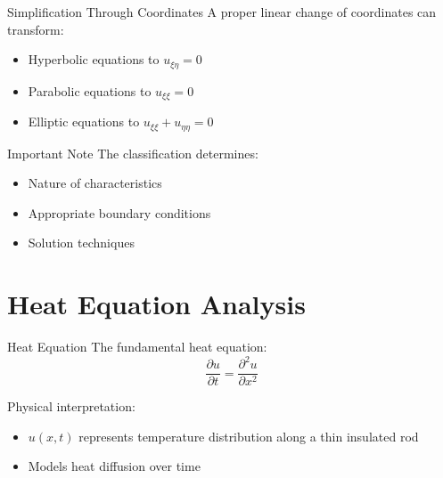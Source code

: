 \documentclass{beamer}
\begin{document}
\begin{frame}{Simplification Through Coordinates}
    A proper linear change of coordinates can transform:
    \begin{itemize}
        \item Hyperbolic equations to $u_{\xi\eta} = 0$
        \item Parabolic equations to $u_{\xi\xi} = 0$
        \item Elliptic equations to $u_{\xi\xi} + u_{\eta\eta} = 0$
    \end{itemize}
    
    \begin{alertblock}{Important Note}
        The classification determines:
        \begin{itemize}
            \item Nature of characteristics
            \item Appropriate boundary conditions
            \item Solution techniques
        \end{itemize}
    \end{alertblock}
\end{frame}


\section{Heat Equation Analysis}

\begin{frame}{Heat Equation}
    The fundamental heat equation:
    \[
    \frac{\partial u}{\partial t} = \frac{\partial^2 u}{\partial x^2}
    \]
    
    Physical interpretation:
    \begin{itemize}
        \item $u(x,t)$ represents temperature distribution along a thin insulated rod
        \item Models heat diffusion over time
    \end{itemize}
\end{frame}
\end{document}

